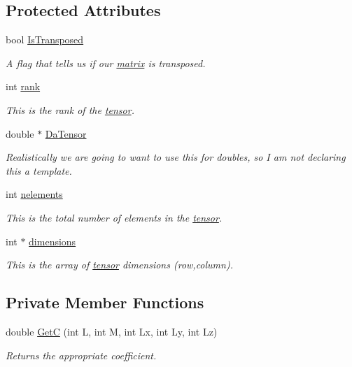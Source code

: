 \subsection*{Protected Attributes}
\begin{DoxyCompactItemize}
\item 
bool \hyperlink{classJKBuilder_1_1matrix_a77fa48e57c519482de2ec7ec182b16ef}{IsTransposed}
\begin{DoxyCompactList}\small\item\em A flag that tells us if our \hyperlink{classJKBuilder_1_1matrix}{matrix} is transposed. \item\end{DoxyCompactList}\item 
int \hyperlink{classJKBuilder_1_1tensor_a6cfd95afd0afebd625b889fb6e58371c}{rank}
\begin{DoxyCompactList}\small\item\em This is the rank of the \hyperlink{classJKBuilder_1_1tensor}{tensor}. \item\end{DoxyCompactList}\item 
double $\ast$ \hyperlink{classJKBuilder_1_1tensor_a91f7b1e58c0e5d1a49ddb8b80ab7790e}{DaTensor}
\begin{DoxyCompactList}\small\item\em Realistically we are going to want to use this for doubles, so I am not declaring this a template. \item\end{DoxyCompactList}\item 
int \hyperlink{classJKBuilder_1_1tensor_a23ae6a00bed19d2ad34d439636e797da}{nelements}
\begin{DoxyCompactList}\small\item\em This is the total number of elements in the \hyperlink{classJKBuilder_1_1tensor}{tensor}. \item\end{DoxyCompactList}\item 
int $\ast$ \hyperlink{classJKBuilder_1_1tensor_a2ce1e6e0782ddee097f2c4aa2663d3e9}{dimensions}
\begin{DoxyCompactList}\small\item\em This is the array of \hyperlink{classJKBuilder_1_1tensor}{tensor} dimensions (row,column). \item\end{DoxyCompactList}\end{DoxyCompactItemize}
\subsection*{Private Member Functions}
\begin{DoxyCompactItemize}
\item 
double \hyperlink{classJKBuilder_1_1CG2SG_a755586288e38b18e91f6e2437f979789}{GetC} (int L, int M, int Lx, int Ly, int Lz)
\begin{DoxyCompactList}\small\item\em Returns the appropriate coefficient. \item\end{DoxyCompactList}\end{DoxyCompactItemize}


